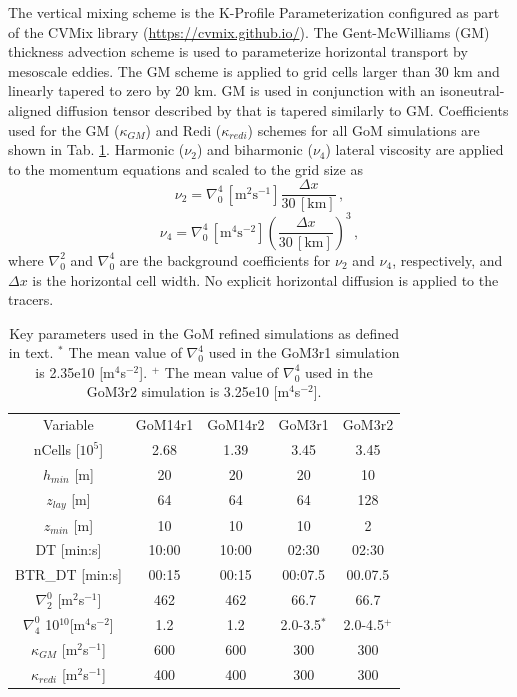The vertical mixing scheme is the K-Profile Parameterization \citep[KPP, ][]{large1994oceanic, van2018kpp} configured as part of the CVMix library (\url{https://cvmix.github.io/}). The Gent-McWilliams (GM) thickness advection scheme \citep{gent1990isopycnal} is used to parameterize horizontal transport by mesoscale eddies. The GM scheme is applied to grid cells larger than 30 km and linearly tapered to zero by 20 km. GM is used in conjunction with an isoneutral-aligned diffusion tensor described by \citep{redi1982oceanic} that is tapered similarly to GM. Coefficients used for the GM ($\kappa_{GM}$) and Redi ($\kappa_{redi}$) schemes for all GoM simulations are shown in Tab. \ref{tab:mpaso_sims}. Harmonic ($\nu_2$) and biharmonic ($\nu_4$) lateral viscosity are applied to the momentum equations and scaled to the grid size as 
\begin{equation}
    \nu_2 = \nabla_0^4 \, [\textrm{m}^2 \textrm{s}^{-1}] \frac{\Delta x}{30 \, [\textrm{km}]} \, ,
\end{equation}
\begin{equation}
    \nu_4 = \nabla_0^4 \, [\textrm{m}^4 \textrm{s}^{-2}] \left(\frac{\Delta x}{30 \, [\textrm{km}]}\right)^3 \, ,  
\end{equation}
where $\nabla_0^2$ and $\nabla_0^4$ are the background coefficients for $\nu_2$ and $\nu_4$, respectively, and $\Delta x$ is the horizontal cell width. No explicit horizontal diffusion is applied to the tracers. 

\begin{table}[t] 
\caption{Key parameters used in the GoM refined simulations as defined in text. $^*$ The mean value of $\nabla_0^4$ used in the GoM3r1 simulation is 2.35e10 [m$^4$s$^{-2}$]. $^+$ The mean value of $\nabla_0^4$ used in the GoM3r2 simulation is 3.25e10 [m$^4$s$^{-2}$].} \label{tab:mpaso_sims}
\begin{center}
\begin{tabular}{ccccc}
\hline
Variable & GoM14r1 & GoM14r2 & GoM3r1 & GoM3r2 \\
nCells [$10^5$] & 2.68 & 1.39 & 3.45 & 3.45 \\
$h_{min}$ [m] & 20 & 20 & 20 & 10 \\
$z_{lay}$ [m] & 64 & 64 & 64 & 128 \\
$z_{min}$ [m] & 10 & 10 & 10 & 2 \\
DT [min:s] & 10:00 & 10:00 & 02:30 & 02:30 \\
BTR\_DT [min:s] & 00:15 & 00:15 & 00:07.5 & 00.07.5 \\
$\nabla_2^0$ [m$^2$s$^{-1}$] & 462 & 462 & 66.7 & 66.7 \\
$\nabla_4^0$ 10$^{10}$[m$^4$s$^{-2}$] & 1.2 & 1.2 & 2.0-3.5$^*$ & 2.0-4.5$^+$ \\
$\kappa_{GM}$ [m$^2$s$^{-1}$] & 600 & 600 & 300 & 300 \\
$\kappa_{redi}$ [m$^2$s$^{-1}$] & 400 & 400 & 300 & 300 \\
\hline
\end{tabular}
\end{center}
\end{table}

